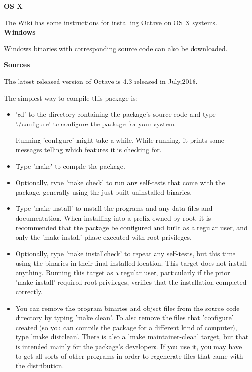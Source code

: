  \textbf{OS X}

 The Wiki has some instructions for installing Octave on OS X systems.\\
 
\textbf{Windows}
 
 Windows binaries with corresponding source code can also be downloaded.
 
 \textbf{Sources}
 
 The latest released version of Octave is 4.3 released in July,2016.
 
  The simplest way to compile this package is:
 \begin{itemize}
 
\item 'cd' to the directory containing the package's source code and type './configure' to configure the package for your system.
 
Running 'configure' might take a while.  While running, it prints
 some messages telling which features it is checking for.
 
\item Type 'make' to compile the package.
 
\item Optionally, type 'make check' to run any self-tests that come with
 the package, generally using the just-built uninstalled binaries.
 
\item Type 'make install' to install the programs and any data files and
 documentation.  When installing into a prefix owned by root, it is
 recommended that the package be configured and built as a regular
 user, and only the 'make install' phase executed with root
 privileges.
 
\item Optionally, type 'make installcheck' to repeat any self-tests, but
 this time using the binaries in their final installed location.
 This target does not install anything.  Running this target as a
 regular user, particularly if the prior 'make install' required
 root privileges, verifies that the installation completed
 correctly.
 
\item You can remove the program binaries and object files from the
 source code directory by typing 'make clean'.  To also remove the
 files that 'configure' created (so you can compile the package for
 a different kind of computer), type 'make distclean'.  There is
 also a 'make maintainer-clean' target, but that is intended mainly
 for the package's developers.  If you use it, you may have to get
 all sorts of other programs in order to regenerate files that came
 with the distribution.
 

\end{itemize}
